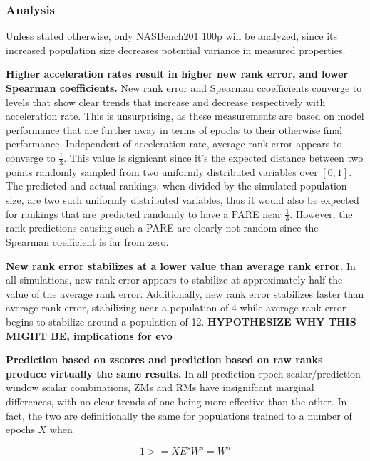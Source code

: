 \documentclass[twocolumn]{article}
\begin{document}
\subsubsection{Analysis}

Unless stated otherwise, only NASBench201 100p will be analyzed, since its increased population size decreases potential variance in measured properties.

\textbf{Higher acceleration rates result in higher new rank error, and lower Spearman coefficients.}
New rank error and Spearman ccoefficients converge to levels that show clear trends that increase and decrease respectively with acceleration rate.
This is unsurprising, as these measurements are based on model performance that are further away in terms of epochs to their
otherwise final performance. 
Independent of acceleration rate, average rank error appears to converge to $\frac{1}{3}$.
This value is signicant since it's the expected distance between two points randomly sampled from two uniformly distributed variables over $[0, 1]$.
The predicted and actual rankings, when divided by the simulated population size, are two such uniformly distributed variables, 
thus it would also be expected for rankings that are predicted randomly to have a PARE near $\frac{1}{3}$.
However, the rank predictions causing such a PARE are clearly not random since the Spearman coefficient is far from zero.

\textbf{New rank error stabilizes at a lower value than average rank error.}
In all simulations, new rank error appears to stabilize at approximately half the value of the average rank error.
Additionally, new rank error stabilizes faster than average rank error, stabilizing near a population of 4 while
average rank error begins to stabilize around a population of 12.
\textbf{HYPOTHESIZE WHY THIS MIGHT BE, implications for evo}

\textbf{Prediction based on zscores and prediction based on raw ranks produce virtually the same results.}
In all prediction epoch scalar/prediction window scalar combinations, ZMs and RMs have insignifcant marginal differences,
with no clear trends of one being more effective than the other.
In fact, the two are definitionally the same for populations trained to a number of epochs $X$ when

\[1 >= XE^{s}W^{s} = W^{a}\]
\end{document}

